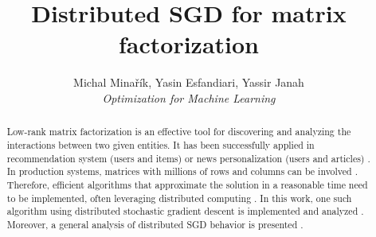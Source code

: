 \documentclass[10pt,conference,compsocconf]{IEEEtran}
\begin{document}
\title{Distributed SGD for matrix factorization}

\author{
 Michal Minařík, Yasin Esfandiari, Yassir Janah\\
 \textit{Optimization for Machine Learning}
}

\maketitle

\begin{abstract}
 Low-rank matrix factorization is an effective tool for discovering and analyzing the interactions between two given entities.
 It has been successfully applied in recommendation system (users and items) or news personalization (users and articles) \cite{gemulla11}.
 In production systems, matrices with millions of rows and columns can be involved \cite{das07}.
 Therefore, efficient algorithms that approximate the solution in a reasonable time need to be implemented, often leveraging distributed computing \cite{liu10, das07}.
 In this work, one such algorithm using distributed stochastic gradient descent is implemented and analyzed \cite{gemulla11}.
 Moreover, a general analysis of distributed SGD behavior is presented \cite{zhang17,yu21,ahn15,swenson20}.
\end{abstract}

\end{document}

